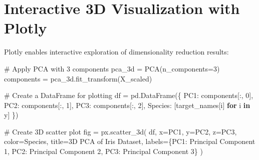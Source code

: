 \documentclass[
  letterpaper,
  DIV=11,
  numbers=noendperiod]{scrreprt}
\newenvironment{Shaded}{\begin{snugshade}}{\end{snugshade}}
\newcommand{\CommentTok}[1]{\textcolor[rgb]{0.37,0.37,0.37}{#1}}
\newcommand{\ControlFlowTok}[1]{\textcolor[rgb]{0.00,0.23,0.31}{\textbf{#1}}}
\newcommand{\DecValTok}[1]{\textcolor[rgb]{0.68,0.00,0.00}{#1}}
\newcommand{\KeywordTok}[1]{\textcolor[rgb]{0.00,0.23,0.31}{\textbf{#1}}}
\newcommand{\NormalTok}[1]{\textcolor[rgb]{0.00,0.23,0.31}{#1}}
\newcommand{\OperatorTok}[1]{\textcolor[rgb]{0.37,0.37,0.37}{#1}}
\newcommand{\StringTok}[1]{\textcolor[rgb]{0.13,0.47,0.30}{#1}}
\begin{document}
\section{Interactive 3D Visualization with
Plotly}\label{interactive-3d-visualization-with-plotly}

Plotly enables interactive exploration of dimensionality reduction
results:

\begin{Shaded}
\begin{Highlighting}[]
\CommentTok{\# Apply PCA with 3 components}
\NormalTok{pca\_3d }\OperatorTok{=}\NormalTok{ PCA(n\_components}\OperatorTok{=}\DecValTok{3}\NormalTok{)}
\NormalTok{components }\OperatorTok{=}\NormalTok{ pca\_3d.fit\_transform(X\_scaled)}

\CommentTok{\# Create a DataFrame for plotting}
\NormalTok{df }\OperatorTok{=}\NormalTok{ pd.DataFrame(\{}
    \StringTok{\textquotesingle{}PC1\textquotesingle{}}\NormalTok{: components[:, }\DecValTok{0}\NormalTok{],}
    \StringTok{\textquotesingle{}PC2\textquotesingle{}}\NormalTok{: components[:, }\DecValTok{1}\NormalTok{],}
    \StringTok{\textquotesingle{}PC3\textquotesingle{}}\NormalTok{: components[:, }\DecValTok{2}\NormalTok{],}
    \StringTok{\textquotesingle{}Species\textquotesingle{}}\NormalTok{: [target\_names[i] }\ControlFlowTok{for}\NormalTok{ i }\KeywordTok{in}\NormalTok{ y]}
\NormalTok{\})}

\CommentTok{\# Create 3D scatter plot}
\NormalTok{fig }\OperatorTok{=}\NormalTok{ px.scatter\_3d(}
\NormalTok{    df, x}\OperatorTok{=}\StringTok{\textquotesingle{}PC1\textquotesingle{}}\NormalTok{, y}\OperatorTok{=}\StringTok{\textquotesingle{}PC2\textquotesingle{}}\NormalTok{, z}\OperatorTok{=}\StringTok{\textquotesingle{}PC3\textquotesingle{}}\NormalTok{,}
\NormalTok{    color}\OperatorTok{=}\StringTok{\textquotesingle{}Species\textquotesingle{}}\NormalTok{,}
\NormalTok{    title}\OperatorTok{=}\StringTok{\textquotesingle{}3D PCA of Iris Dataset\textquotesingle{}}\NormalTok{,}
\NormalTok{    labels}\OperatorTok{=}\NormalTok{\{}\StringTok{\textquotesingle{}PC1\textquotesingle{}}\NormalTok{: }\StringTok{\textquotesingle{}Principal Component 1\textquotesingle{}}\NormalTok{, }
            \StringTok{\textquotesingle{}PC2\textquotesingle{}}\NormalTok{: }\StringTok{\textquotesingle{}Principal Component 2\textquotesingle{}}\NormalTok{,}
            \StringTok{\textquotesingle{}PC3\textquotesingle{}}\NormalTok{: }\StringTok{\textquotesingle{}Principal Component 3\textquotesingle{}}\NormalTok{\}}
\NormalTok{)}


\end{Highlighting}
\end{Shaded}
\end{document}
